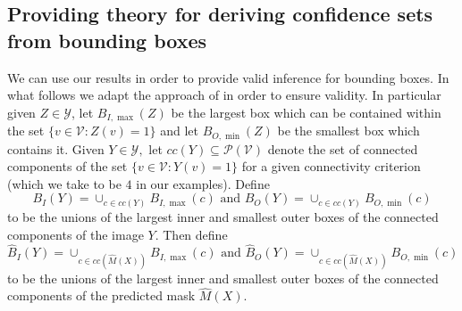 \subsection{Providing theory for deriving confidence sets from bounding boxes}\label{AA:BBtheory}
We can use our results in order to provide valid inference for bounding boxes.  In what follows we adapt the approach of \cite{Andeol2023} in order to ensure validity. In particular given $Z \in \mathcal{Y}$, let $B_{I, \max}(Z)$ be the largest box which can be contained within the set $\lbrace v\in \mathcal{V}: Z(v) = 1 \rbrace$ and let $ B_{O, \min}(Z)$ be the smallest box which contains it. Given $Y \in \mathcal{Y}, $ let $cc(Y) \subseteq \mathcal{P}(\mathcal{V})$ denote the set of connected components of the set $\lbrace v\in \mathcal{V}: Y(v) = 1 \rbrace$ for a given connectivity criterion (which we take to be $4$ in our examples). Define 
$$B_I(Y) = \cup_{c \in cc(Y)} B_{I, \max}(c) \text{ and } B_O(Y) = \cup_{c \in cc(Y)} B_{O, \min}(c)$$
to be the unions of the largest inner and smallest outer boxes of the connected components of the image $Y$. Then define
$$\hat{B}_I(Y) = \cup_{c \in cc(\hat{M}(X)) } B_{I, \max}(c) \text{ and } \hat{B}_O(Y) = \cup_{c \in cc(\hat{M}(X))} B_{O, \min}(c)$$
to be the unions of the largest inner and smallest outer boxes of the connected components of the predicted mask $\hat{M}(X).$

